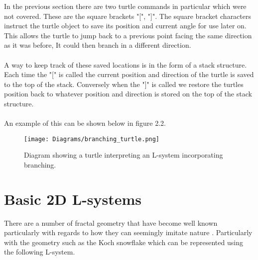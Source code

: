 In the previous section there are two turtle commands in particular which were not covered. These are the square brackets "[", "]". The square bracket characters instruct the turtle object to save its position and current angle for use later on. This allows the turtle to jump back to a previous point facing the same direction as it was before, It could then branch in a different direction.\\
\\
A way to keep track of these saved locations is in the form of a stack structure. Each time the "[" is called the current position and direction of the turtle is saved to the top of the stack. Conversely when the "]" is called we restore the turtles position back to whatever position and direction is stored on the top of the stack structure. \\
\\
An example of this can be shown below in figure 2.2.\\

\begin{figure}[htbp]
	{\centering
		\vspace{7px}
		\texttt{[image: Diagrams/branching\_turtle.png]}
		\caption{Diagram showing a turtle interpreting an L-system incorporating branching.}
	}
\end{figure}
\FloatBarrier


\section{Basic 2D L-systems} 

There are a number of fractal geometry that have become well known particularly with regards to how they can seemingly imitate nature \cite{mandelbrot1982fractal}. Particularly with the geometry such as the Koch snowflake which can be represented using the following L-system.

